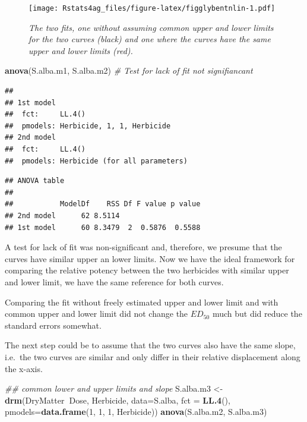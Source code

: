 \documentclass[letterpaper,]{book}
\newenvironment{Shaded}{\begin{snugshade}}{\end{snugshade}}
\newcommand{\CommentTok}[1]{\textcolor[rgb]{0.56,0.35,0.01}{\textit{#1}}}
\newcommand{\DataTypeTok}[1]{\textcolor[rgb]{0.13,0.29,0.53}{#1}}
\newcommand{\DecValTok}[1]{\textcolor[rgb]{0.00,0.00,0.81}{#1}}
\newcommand{\KeywordTok}[1]{\textcolor[rgb]{0.13,0.29,0.53}{\textbf{#1}}}
\newcommand{\NormalTok}[1]{#1}
\newcommand{\OperatorTok}[1]{\textcolor[rgb]{0.81,0.36,0.00}{\textbf{#1}}}
\newcommand{\StringTok}[1]{\textcolor[rgb]{0.31,0.60,0.02}{#1}}
\begin{document}
\begin{figure}
\centering
\texttt{[image: Rstats4ag\_files/figure-latex/figglybentnlin-1.pdf]}
\caption{\label{fig:figglybentnlin}\emph{The two fits, one without assuming common upper and lower limits for the two curves (black) and one where the curves have the same upper and lower limits (red).}}
\end{figure}

\begin{Shaded}
\begin{Highlighting}[]
\KeywordTok{anova}\NormalTok{(S.alba.m1, S.alba.m2) }\CommentTok{# Test for lack of fit not signifiancant}
\end{Highlighting}
\end{Shaded}

\begin{verbatim}
## 
## 1st model
##  fct:     LL.4()
##  pmodels: Herbicide, 1, 1, Herbicide
## 2nd model
##  fct:     LL.4()
##  pmodels: Herbicide (for all parameters)
\end{verbatim}

\begin{verbatim}
## ANOVA table
## 
##           ModelDf    RSS Df F value p value
## 2nd model      62 8.5114                   
## 1st model      60 8.3479  2  0.5876  0.5588
\end{verbatim}

A test for lack of fit was non-significant and, therefore, we presume that the curves have similar upper an lower limits. Now we have the ideal framework for comparing the relative potency between the two herbicides with similar upper and lower limit, we have the same reference for both curves.

Comparing the fit without freely estimated upper and lower limit and with common upper and lower limit did not change the \(ED_{50}\) much but did reduce the standard errors somewhat.

The next step could be to assume that the two curves also have the same slope, i.e.~the two curves are similar and only differ in their relative displacement along the x-axis.

\begin{Shaded}
\begin{Highlighting}[]
\CommentTok{##  common lower and upper limits and slope}
\NormalTok{S.alba.m3 <-}\StringTok{ }\KeywordTok{drm}\NormalTok{(DryMatter}\OperatorTok{~}\NormalTok{Dose, Herbicide, }\DataTypeTok{data=}\NormalTok{S.alba, }\DataTypeTok{fct =} \KeywordTok{LL.4}\NormalTok{(),}
                 \DataTypeTok{pmodels=}\KeywordTok{data.frame}\NormalTok{(}\DecValTok{1}\NormalTok{, }\DecValTok{1}\NormalTok{, }\DecValTok{1}\NormalTok{, Herbicide)) }
\KeywordTok{anova}\NormalTok{(S.alba.m2, S.alba.m3)}
\end{Highlighting}
\end{Shaded}
\end{document}
